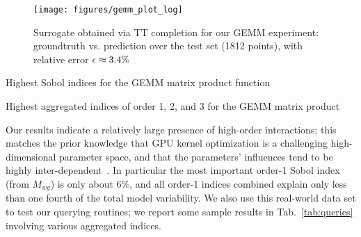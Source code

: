 \documentclass[review, twocolumn]{svjour3}          %
\begin{document}
\begin{figure}[h]\center
	\texttt{[image: figures/gemm\_plot\_log]}
	\caption{Surrogate obtained via TT completion for our GEMM experiment: groundtruth vs. prediction over the test set (1812 points), with relative error $\mbox{$\epsilon$} \approx 3.4\%$}
	\label{fig:gemm_plot_log}
\end{figure}

\begin{table*}[h]
	\centering
	\caption{Highest Sobol indices for the GEMM matrix product function}
	
	\label{tab:CLTune1}
\end{table*}

\begin{table*}[h]
	\centering
	\caption{Highest aggregated indices of order 1, 2, and 3 for the GEMM matrix product}
	
	\label{tab:CLTune2}
\end{table*}

Our results indicate a relatively large presence of high-order interactions; this matches the prior knowledge that GPU kernel optimization is a challenging high-dimensional parameter space, and that the parameters' influences tend to be highly inter-dependent~\cite{NC:15}. In particular the most important order-1 Sobol index (from $M_{wg}$) is only about $6\%$, and all order-1 indices combined explain only less than one fourth of the total model variability. We also use this real-world data set to test our querying routines; we report some sample results in Tab.~\ref{tab:queries} involving various aggregated indices.
\end{document}
